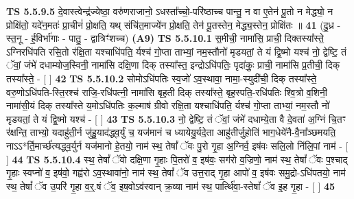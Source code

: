 \documentclass[17pt]{extarticle}
\begin{document}
                                \textbf{ TS 5.5.9.5} \newline
                  दे॒वास्त्वेन्द्र॑ज्येष्ठा॒ वरु॑णराजानो॒ ऽधस्ता᳚च्चो॒-परि॑ष्ठाच्च पान्तु॒ न वा ए॒तेन॑ पू॒तो न मेद्ध्यो॒ न प्रोक्षि॑तो॒ यदे॑न॒मतः॑ प्रा॒चीनं॑ प्रो॒क्षति॒ यथ् संचि॑त॒माज्ये॑न प्रो॒क्षति॒ तेन॑ पू॒तस्तेन॒ मेद्ध्य॒स्तेन॒ प्रोक्षि॑तः ॥ \textbf{  41} \newline
                  \newline
                      (दु॒ध्र - स्त॒नू - र्ह॒विर्भा॑गाः - पातु॒ - द्वात्रिꣳ॑शच्च)  \textbf{(A9)} \newline \newline
                                        \textbf{ TS 5.5.10.1} \newline
                  स॒॒मीची॒॒ नामा॑सि॒ प्राची॒ दिक्तस्या᳚स्ते॒ ऽग्निरधि॑पति रसि॒तो र॑क्षि॒ता यश्चाधि॑पति॒ र्यश्च॑ गो॒प्ता ताभ्यां॒ नम॒स्तौनो॑ मृडयतां॒ ते यं द्वि॒ष्मो यश्च॑ नो॒ द्वेष्टि॒ तं ॅवां॒ जंभे॑ दधाम्योज॒स्विनी॒ नामा॑सि दक्षि॒णा दिक् तस्या᳚स्त॒ इन्द्रोऽधि॑पतिः॒ पृदा॑कुः॒ प्राची॒ नामा॑सि प्र॒तीची॒ दिक् तस्या᳚स्ते॒ - [  ] \textbf{  42} \newline
                  \newline
                                \textbf{ TS 5.5.10.2} \newline
                  सोमोऽधि॑पतिः स्व॒जो॑ ऽव॒स्थावा॒ नामा॒-स्युदी॑ची॒ दिक् तस्या᳚स्ते॒ वरु॒णोऽधि॑पति-स्ति॒रश्च॑ राजि॒-रधि॑पत्नी॒ नामा॑सि बृह॒ती दिक् तस्या᳚स्ते॒ बृह॒स्पति॒-रधि॑पतिः श्वि॒त्रो व॒शिनी॒ नामा॑सी॒यं दिक् तस्या᳚स्ते य॒मोऽधि॑पतिः क॒ल्माष॑ ग्रीवो रक्षि॒ता यश्चाधि॑पति॒ र्यश्च॑ गो॒प्ता ताभ्यां॒ नम॒स्तौ नो॑ मृडयतां॒ ते यं द्वि॒ष्मो यश्च॑ - [  ] \textbf{  43} \newline
                  \newline
                                \textbf{ TS 5.5.10.3} \newline
                  नो॒ द्वेष्टि॒ तं ॅवां॒ जंभे॑ दधाम्ये॒ता वै दे॒वता॑ अ॒ग्निं चि॒तꣳ र॑क्षन्ति॒ ताभ्यो॒ यदाहु॑ती॒र्न जु॑हु॒याद॑द्ध्व॒र्युं च॒ यज॑मानं च ध्यायेयु॒र्यदे॒ता आहु॑तीर्जु॒होति॑ भाग॒धेये॑नै-वै॒ना᳚ञ्छमयति॒ नाऽऽ*र्ति॒मार्च्छ॑त्यद्ध्व॒र्युर्न यज॑मानो हे॒तयो॒ नाम॑ स्थ॒ तेषां᳚ ॅवः पु॒रो गृ॒हा अ॒ग्निर्व॒ इष॑वः सलि॒लो नि॑लि॒पां नाम॑ - [  ] \textbf{  44} \newline
                  \newline
                                \textbf{ TS 5.5.10.4} \newline
                  स्थ॒ तेषां᳚ ॅवो दक्षि॒णा गृ॒हाः पि॒तरो॑ व॒ इष॑वः॒ सग॑रो व॒ज्रिणो॒ नाम॑ स्थ॒ तेषां᳚ ॅवः प॒श्चाद् गृ॒हाः स्वप्नो॑ व॒ इष॑वो॒ गह्व॑रो ऽव॒स्थावा॑नो॒ नाम॑ स्थ॒ तेषां᳚ ॅव उत्त॒राद् गृ॒हा आपो॑ व॒ इष॑वः समु॒द्रो-ऽधि॑पतयो॒ नाम॑ स्थ॒ तेषां᳚ ॅव उ॒परि॑ गृ॒हा व॒र्॒.षं ॅव॒ इष॒वोऽव॑स्वान् क्र॒व्या नाम॑ स्थ॒ पार्त्थि॑वा॒-स्तेषां᳚ ॅव इ॒ह गृ॒हा - [  ] \textbf{  45} \newline
\end{document}
